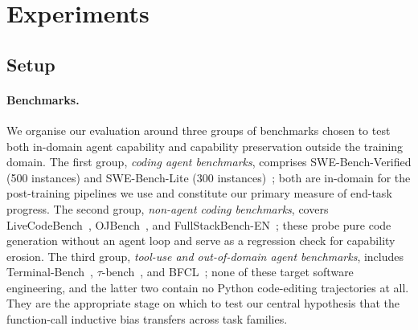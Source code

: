 %

\section{Experiments}
\label{sec:exp}

\subsection{Setup}
\label{sec:exp:setup}

\paragraph{Benchmarks.}
We organise our evaluation around three groups of benchmarks chosen to test
both in-domain agent capability and capability preservation outside the
training domain. The first group, \emph{coding agent benchmarks}, comprises
SWE-Bench-Verified (500 instances) and SWE-Bench-Lite
(300 instances)~\citep{swebench}; both are in-domain for the
post-training pipelines we use and constitute our primary measure of
end-task progress. The second group, \emph{non-agent coding benchmarks},
covers LiveCodeBench~\citep{livecodebench}, OJBench~\citep{ojbench},
and FullStackBench-EN~\citep{fullstackbench}; these probe pure code
generation without an agent loop and serve as a regression check for
capability erosion. The third group, \emph{tool-use and out-of-domain agent
benchmarks}, includes Terminal-Bench~\citep{terminalbench},
$\tau$-bench~\citep{taubench}, and BFCL~\citep{bfcl}; none of
these target software engineering, and the latter two contain no Python
code-editing trajectories at all. They are the appropriate stage on which
to test our central hypothesis that the function-call inductive bias
transfers across task families.

